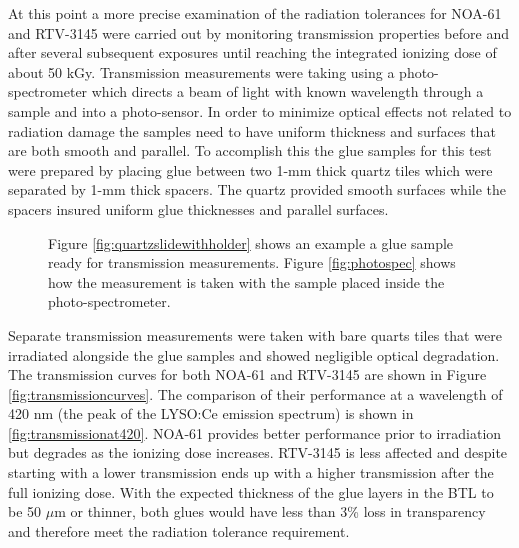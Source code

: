At this point a more precise examination of the radiation tolerances for NOA-61 and RTV-3145 were carried out by monitoring transmission properties before and after several subsequent exposures until reaching the integrated ionizing dose of about 50 kGy.  Transmission measurements were taking using a photo-spectrometer which directs a beam of light with known wavelength through a sample and into a photo-sensor.  In order to minimize optical effects not related to radiation damage the samples need to have uniform thickness and surfaces that are both smooth and parallel.  To accomplish this the glue samples for this test were prepared by placing glue between two 1-mm thick quartz tiles which were separated by 1-mm thick spacers.  The quartz provided smooth surfaces while the spacers insured uniform glue thicknesses and parallel surfaces.  
\begin{figure}[h]
	\centering
	\qquad
	\caption{Figure \ref{fig:quartzslidewithholder} shows an example a glue sample ready for transmission measurements.  Figure \ref{fig:photospec} shows how the measurement is taken with the sample placed inside the photo-spectrometer.}
	\label{fig:transmissionsetup}
\end{figure}
Separate transmission measurements were taken with bare quarts tiles that were irradiated alongside the glue samples and showed negligible optical degradation.  The transmission curves for both NOA-61 and RTV-3145 are shown in Figure \ref{fig:transmissioncurves}.  The comparison of their performance at a wavelength of 420 nm (the peak of the LYSO:Ce emission spectrum) is shown in \ref{fig:transmissionat420}.  NOA-61 provides better performance prior to irradiation but degrades as the ionizing dose increases.  RTV-3145 is less affected and despite starting with a lower transmission ends up with a higher transmission after the full ionizing dose.  With the expected thickness of the glue layers in the BTL to be 50 $\mu$m or thinner, both glues would have less than 3\% loss in transparency and therefore meet the radiation tolerance requirement.

